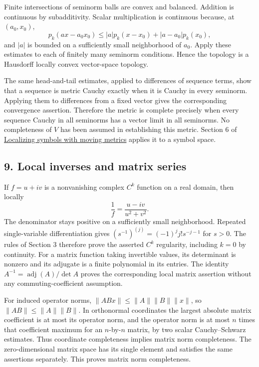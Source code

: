 \documentclass[
  11pt,
]{article}
\begin{document}
Finite intersections of seminorm balls are convex and balanced. Addition
is continuous by subadditivity. Scalar multiplication is continuous
because, at \((a_0,x_0)\), \[
p_k(ax-a_0x_0)\leq |a|p_k(x-x_0)+|a-a_0|p_k(x_0),
\] and \(|a|\) is bounded on a sufficiently small neighborhood of
\(a_0\). Apply these estimates to each of finitely many seminorm
conditions. Hence the topology is a Hausdorff locally convex
vector-space topology.

The same head-and-tail estimates, applied to differences of sequence
terms, show that a sequence is metric Cauchy exactly when it is Cauchy
in every seminorm. Applying them to differences from a fixed vector
gives the corresponding convergence assertion. Therefore the metric is
complete precisely when every sequence Cauchy in all seminorms has a
vector limit in all seminorms. No completeness of \(V\) has been assumed
in establishing this metric. Section 6 of
\href{metric-localization.pdf}{Localizing symbols with moving metrics}
applies it to a symbol space.

\subsection{9. Local inverses and matrix
series}\label{local-inverses-and-matrix-series}

If \(f=u+iv\) is a nonvanishing complex \(C^k\) function on a real
domain, then locally \[
\frac1f=\frac{u-iv}{u^2+v^2}.
\] The denominator stays positive on a sufficiently small neighborhood.
Repeated single-variable differentiation gives
\((s^{-1})^{(j)}=(-1)^j j!s^{-j-1}\) for \(s>0\). The rules of Section 3
therefore prove the asserted \(C^k\) regularity, including \(k=0\) by
continuity. For a matrix function taking invertible values, its
determinant is nonzero and its adjugate is a finite polynomial in its
entries. The identity \(A^{-1}=\operatorname{adj}(A)/\det A\) proves the
corresponding local matrix assertion without any commuting-coefficient
assumption.

For induced operator norms, \(\|ABx\|\leq\|A\|\|B\|\|x\|\), so
\(\|AB\|\leq\|A\|\|B\|\). In orthonormal coordinates the largest
absolute matrix coefficient is at most its operator norm, and the
operator norm is at most \(n\) times that coefficient maximum for an
\(n\)-by-\(n\) matrix, by two scalar Cauchy--Schwarz estimates. Thus
coordinate completeness implies matrix norm completeness. The
zero-dimensional matrix space has its single element and satisfies the
same assertions separately. This proves matrix norm completeness.
\end{document}
